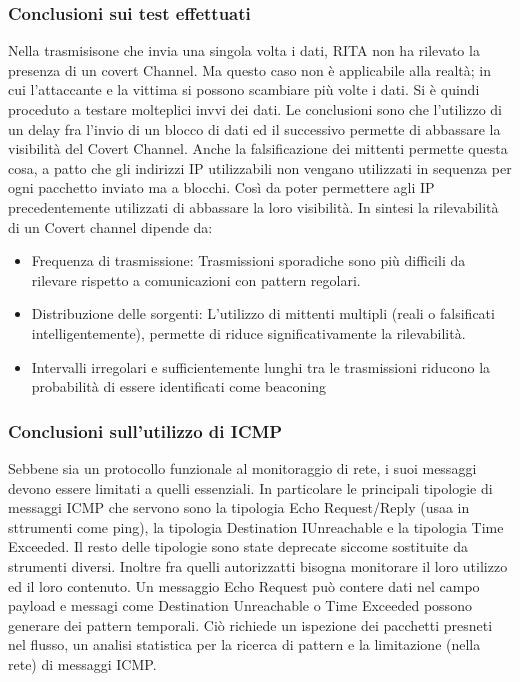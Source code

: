 \begin{frame}
\frametitle{Conclusioni sui test effettuati}
Nella trasmisisone che invia una singola volta i dati, RITA non ha rilevato 
la presenza di un covert Channel. Ma questo caso non è applicabile alla 
realtà; in cui l'attaccante e la vittima si possono scambiare più volte 
i dati. Si è quindi proceduto a testare molteplici invvi dei dati. 
\vspace{2ex} \newline 
Le conclusioni sono che l'utilizzo di un delay fra l'invio di un blocco di 
dati ed il successivo permette di abbassare la visibilità del Covert Channel. 
Anche la falsificazione dei mittenti permette questa cosa, a patto che gli 
indirizzi IP utilizzabili non vengano utilizzati in sequenza per ogni pacchetto 
inviato ma a blocchi. Così da poter permettere agli IP precedentemente utilizzati 
di abbassare la loro visibilità. 
\vspace{1ex} \newline
In sintesi la rilevabilità di un Covert channel dipende da: 
\begin{itemize}
    \item Frequenza di trasmissione: 
    Trasmissioni sporadiche sono più difficili da rilevare rispetto a 
    comunicazioni con pattern regolari. 
    \item Distribuzione delle sorgenti: 
    L'utilizzo di mittenti multipli (reali o falsificati intelligentemente), 
    permette di riduce significativamente la rilevabilità. 
    \item Intervalli irregolari e sufficientemente lunghi tra le 
    trasmissioni riducono la probabilità di essere identificati come 
    beaconing
\end{itemize}
\end{frame} 

\begin{frame}
\frametitle{Conclusioni sull'utilizzo di ICMP}
Sebbene sia un protocollo funzionale al monitoraggio di rete, i suoi messaggi 
devono essere limitati a quelli essenziali. In particolare le principali 
tipologie di messaggi ICMP che servono sono la tipologia Echo Request/Reply 
(usaa in sttrumenti come ping), la tipologia Destination IUnreachable e la 
tipologia Time Exceeded. Il resto delle tipologie sono state deprecate siccome 
sostituite da strumenti diversi. 
\vspace{1ex} \newline 
Inoltre fra quelli autorizzatti bisogna monitorare il loro utilizzo ed il 
loro contenuto. Un messaggio Echo Request può contere dati nel campo payload 
e messagi come Destination Unreachable o Time Exceeded possono generare 
dei pattern temporali. 
\vspace{2ex} \newline 
Ciò richiede un ispezione dei pacchetti presneti nel flusso, un analisi 
statistica per la ricerca di pattern e la limitazione (nella rete) di 
messaggi ICMP. 
\end{frame} 
